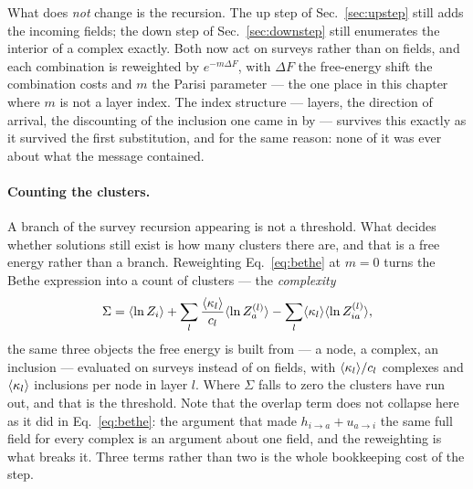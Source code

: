 What does \emph{not} change is the recursion. The up step of
Sec.~\ref{sec:upstep} still adds the incoming fields; the down step of
Sec.~\ref{sec:downstep} still enumerates the interior of a complex exactly.
Both now act on surveys rather than on fields, and each combination is
reweighted by $e^{-m\Delta F}$, with $\Delta F$ the free-energy shift the
combination costs and $m$ the Parisi parameter --- the one place in this chapter
where $m$ is not a layer index. The index structure --- layers,
the direction of arrival, the discounting of the inclusion one came in by ---
survives this exactly as it survived the first substitution, and for the same
reason: none of it was ever about what the message contained.

\paragraph{Counting the clusters.} A branch of the survey recursion appearing is
not a threshold. What decides whether solutions still exist is how many clusters
there are, and that is a free energy rather than a branch. Reweighting
Eq.~\eqref{eq:bethe} at $m=0$ turns the Bethe expression into a count of
clusters --- the \emph{complexity}
\begin{equation}
  \Sigma=\langle \ln Z_{i} \rangle
        +\sum_{l}\frac{\langle \kappa_{l} \rangle}{c_{l}}\langle \ln Z^{(l)}_{a} \rangle
        -\sum_{l}\langle \kappa_{l} \rangle\langle \ln Z^{(l)}_{ia} \rangle,
  \label{eq:sigmagen}
\end{equation}
the same three objects the free energy is built from --- a node, a complex, an
inclusion --- evaluated on surveys instead of on fields, with
$\langle \kappa_{l} \rangle/c_{l}$ complexes and $\langle \kappa_{l} \rangle$ inclusions per node in
layer $l$. Where $\Sigma$
falls to zero the clusters have run out, and that is the threshold. Note that
the overlap term does not collapse here as it did in
Eq.~\eqref{eq:bethe}: the argument that made $h_{i\to a}+u_{a\to i}$ the same
full field for every complex is an argument about one field, and the
reweighting is what breaks it. Three terms rather than two is the whole
bookkeeping cost of the step.

